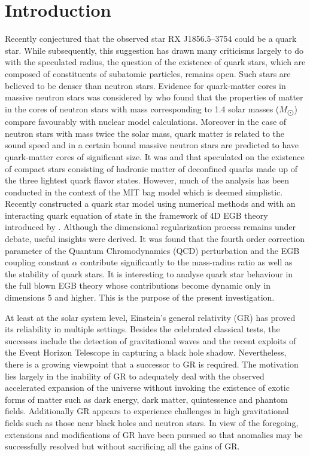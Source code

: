 \documentclass[]{aastex631}
\begin{document}

 

\section{Introduction}\label{sec1}

Recently \cite{drake} conjectured that the observed star  RX J1856.5–3754 could be a quark star. While subsequently, this suggestion has drawn many criticisms largely to do with the speculated radius, the question of the existence of quark stars, which are composed of constituents of subatomic particles,  remains open. Such stars are believed to be denser than neutron stars. Evidence for quark-matter cores in massive neutron stars was considered by \cite{annala} who found that the properties of matter in the cores of neutron stars with mass corresponding to 1.4 solar masses ($M_{\bigodot}$) compare favourably with nuclear model calculations. Moreover in the case of  neutron stars with mass twice the solar mass,  quark matter is related to the   sound speed and in a certain bound  massive neutron stars are predicted to have  quark-matter cores of significant size. It was \cite{bodmer} and  \cite{witten} that speculated on the existence of compact stars consisting of hadronic matter of deconfined quarks made up of the three lightest quark flavor states.  However, much of the analysis has been conducted in the context of the MIT bag model \citep{chodos1,chodos2,peshier} which is deemed simplistic.  Recently \cite{ayann1} constructed a quark star model using numerical methods and with an interacting quark equation of state in the framework of 4D EGB theory introduced by  \cite{glavan}. Although the dimensional regularization process remains under debate, useful insights were derived.   It was found that the fourth order correction parameter of the Quantum Chromodynamics (QCD) perturbation and the EGB coupling constant $\alpha$ contribute significantly to the mass-radius ratio as well as the stability of quark stars. It is interesting to analyse quark star behaviour in the full blown EGB theory whose  contributions become dynamic only in dimensions 5 and higher. This is the purpose of the present investigation. 

At least at the solar system level, Einstein's general relativity (GR) has proved its reliability in multiple settings. Besides the celebrated classical tests, the successes include the detection of gravitational waves and the recent exploits of the Event Horizon Telescope in capturing a black hole shadow. Nevertheless, there is a growing viewpoint that a successor to GR  is required. The motivation lies largely in the inability of GR to adequately deal with the observed accelerated expansion of the universe without invoking the existence of exotic forms of matter such as dark energy, dark matter, quintessence and phantom fields.  Additionally GR appears to experience challenges in high gravitational fields such as those near black holes and neutron stars. In view of the foregoing, extensions and modifications of GR have been pursued so that anomalies may be successfully resolved but without sacrificing all the gains of GR.
\end{document}
